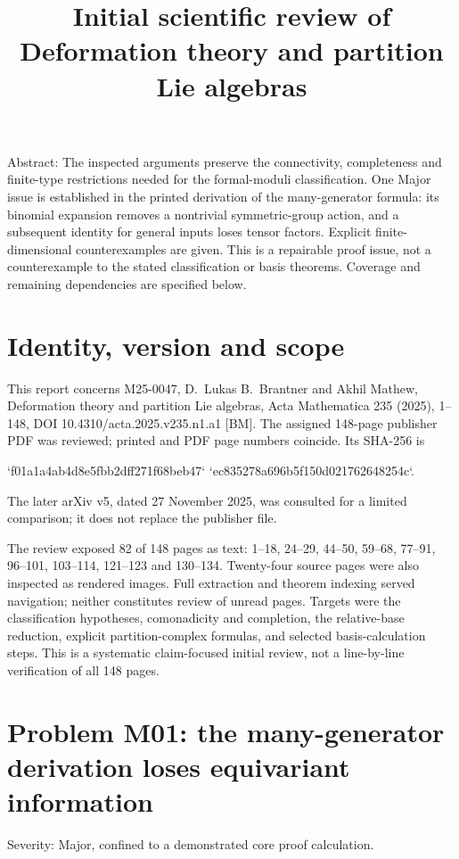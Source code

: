 \documentclass[10pt]{article}
\title{Initial scientific review of
Deformation theory and partition Lie algebras}
\author{}
\date{}
\begin{document}
\maketitle
Abstract: The inspected arguments preserve the connectivity, completeness and finite-type restrictions needed for the formal-moduli classification. One Major issue is established in the printed derivation of the many-generator formula: its binomial expansion removes a nontrivial symmetric-group action, and a subsequent identity for general inputs loses tensor factors. Explicit finite-dimensional counterexamples are given. This is a repairable proof issue, not a counterexample to the stated classification or basis theorems. Coverage and remaining dependencies are specified below.\par
\section*{Identity, version and scope}
This report concerns M25-0047, D. Lukas B. Brantner and Akhil Mathew, Deformation theory and partition Lie algebras, Acta Mathematica 235 (2025), 1–148, DOI 10.4310/acta.2025.v235.n1.a1 [BM]. The assigned 148-page publisher PDF was reviewed; printed and PDF page numbers coincide. Its SHA-256 is\par
`f01a1a4ab4d8e5fbb2dff271f68beb47`
`ec835278a696b5f150d021762648254c`.\par
The later arXiv v5, dated 27 November 2025, was consulted for a limited comparison; it does not replace the publisher file.\par
The review exposed 82 of 148 pages as text: 1–18, 24–29, 44–50, 59–68, 77–91, 96–101, 103–114, 121–123 and 130–134. Twenty-four source pages were also inspected as rendered images. Full extraction and theorem indexing served navigation; neither constitutes review of unread pages. Targets were the classification hypotheses, comonadicity and completion, the relative-base reduction, explicit partition-complex formulas, and selected basis-calculation steps. This is a systematic claim-focused initial review, not a line-by-line verification of all 148 pages.\par
\section*{Problem M01: the many-generator derivation loses equivariant information}
Severity: Major, confined to a demonstrated core proof calculation.\par
\end{document}
